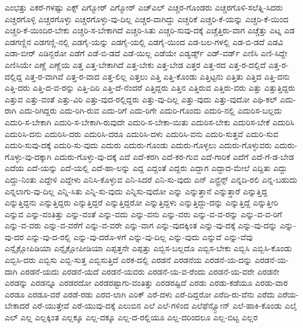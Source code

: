 {ಎಂಭತ್ತು
ಎಕರೆ-ಗಳಷ್ಟು
ಎಕ್ಸ್
ಎಗ್ಮೋರ್
ಎಗ್ಮೋರ್
ಎಚ್ಎಲ್
ಎಚ್ಚರ-ಗೊಂಡರು
ಎಚ್ಚರಗೊಳಿ-ಸಲೆತ್ನಿ-ಸಿದರು
ಎಚ್ಚರಗೊಳ್ಳಿ
ಎಚ್ಚರಗೊಳ್ಳು
ಎಚ್ಚರಗೊಳ್ಳು-ವು-ದಿಲ್ಲ
ಎಚ್ಚರ-ವಾಗಿದ್ದು
ಎಚ್ಚರಿಕೆ
ಎಚ್ಚರಿ-ಕೆ-ಯನ್ನು
ಎಚ್ಚರಿ-ಕೆ-ಯಿಂದ
ಎಚ್ಚರಿ-ಕೆ-ಯಿಂದಿರ-ಬೇಕು
ಎಚ್ಚರಿ-ಸ-ಬೇಕಾಗಿದೆ
ಎಚ್ಚರಿ-ಸಿತು
ಎಚ್ಚರಿ-ಸುವು-ದಕ್ಕೆ
ಎಚ್ಚೆತ್ತಿರು-ವಾಗ
ಎಚ್ಚೆತ್ತು
ಎಟ್ನ
ಎಡ
ಎಡಗಣ್ಣಿನ
ಎಡಗಣ್ಣಿ-ನಲ್ಲಿ
ಎಡಗೈ-ಯನ್ನು
ಎಡಗೈ-ಯಲ್ಲಿ
ಎಡಗೈ-ಯಿಂದ
ಎಡ-ಬಲ-ಗಳಲ್ಲಿ
ಎಡ-ಬಿ-ಡದೆ
ಎಡವಿ
ಎಡಾ-ಬೀರ್
ಎಡಿನ್ಬರೋ
ಎಡೆಗೆ
ಎಡೆ-ಬಿ-ಡದೆ
ಎಡೆ-ಯಿಲ್ಲ
ಎಡೆಯೇ
ಎಡ್ವರ್ಡ್ಸ್
ಎಡ್-ವರ್ಡ್
ಎಣಿಸಿ
ಎಣಿ-ಸಿದ್ದೇ
ಎಣಿಸಿಯೇ
ಎಣ್ಣೆ
ಎಣ್ಣೆಯ
ಎತ್ತ
ಎತ್ತ-ಬೇಕಾಗಿದೆ
ಎತ್ತ-ಬೇಕು
ಎತ್ತ-ಬೇಡ
ಎತ್ತರ
ಎತ್ತ-ರದ
ಎತ್ತ-ರ-ದಲ್ಲಿದೆ
ಎತ್ತ-ರ-ದಲ್ಲಿದ್ದ
ಎತ್ತ-ರ-ವಾಗಿವೆ
ಎತ್ತ-ರ-ವಾದ
ಎತ್ತ-ಲಿಲ್ಲ
ಎತ್ತಲು
ಎತ್ತಿ
ಎತ್ತಿ-ಕೊಂಡು
ಎತ್ತಿಟ್ಟನು
ಎತ್ತಿತು
ಎತ್ತಿದ
ಎತ್ತಿ-ದನು
ಎತ್ತಿ-ದರು
ಎತ್ತಿ-ದ-ವ-ರನ್ನು
ಎತ್ತಿ-ದಿರಿ
ಎತ್ತಿ-ದೆ-ನೆಂದರೆ
ಎತ್ತಿದ್ದರು
ಎತ್ತಿನ
ಎತ್ತಿರುವ
ಎತ್ತಿರು-ವರು
ಎತ್ತು
ಎತ್ತುತ್ತಿದ್ದರು
ಎತ್ತುವ
ಎತ್ತು-ವಂತೆ
ಎತ್ತು-ವಿರಿ
ಎತ್ತು-ವುದ-ರಲ್ಲಿದ್ದರು
ಎತ್ತು-ವು-ದಿಲ್ಲ
ಎತ್ತು-ವುದು
ಎತ್ತು-ವುದೋ
ಎಥಿ-ಕಲ್
ಎದು-ರಾಗಿ
ಎದು-ರಿಗಿದ್ದರು
ಎದು-ರಿಗಿ-ರುವ
ಎದು-ರಿಗೆ
ಎದು-ರಿಗೇ
ಎದುರಿ-ಗೊಂದು
ಎದುರಿ-ನಲ್ಲಿ
ಎದುರಿಸ-ಬಲ್ಲದು
ಎದುರಿ-ಸ-ಬೇಕಾಗಿ
ಎದುರಿ-ಸ-ಬೇಕಾಗಿ-ರುವುದೇ
ಎದುರಿ-ಸ-ಬೇಕಾ-ಯಿತು
ಎದುರಿಸ-ಬೇಕು
ಎದುರಿಸ-ಬೇಕೆ
ಎದುರಿಸಿ
ಎದುರಿಸಿ-ದನು
ಎದುರಿಸಿ-ದರು
ಎದುರಿಸಿ-ದರೂ
ಎದುರಿಸಿ-ದಳು
ಎದುರಿಸಿ-ವನು
ಎದುರಿ-ಸುತ್ತವೆ
ಎದುರಿ-ಸುವ
ಎದುರಿ-ಸುವು-ದಕ್ಕೆ
ಎದುರಿ-ಸು-ವುದು
ಎದುರು
ಎದುರು-ಗೊಂಡು
ಎದುರು-ಗೊಳ್ಳಲು
ಎದುರು-ಗೊಳ್ಳುವರು
ಎದುರು-ಗೊಳ್ಳು-ವು-ದಕ್ಕಾಗಿ
ಎದುರು-ಗೊಳ್ಳು-ವು-ದಕ್ಕೆ
ಎದೆ
ಎದೆ-ಕರಗಿ
ಎದೆ-ಕರ-ಗುವ
ಎದೆ-ಗಾರಿಕೆ
ಎದೆಗೆ
ಎದೆ-ಗೆ-ಡ-ಬೇಡ
ಎದೆಯ
ಎದೆ-ಯನ್ನು
ಎದೆ-ಯಲ್ಲಿ
ಎದೆ-ಹಾ-ಲನ್ನು
ಎದ್ದ
ಎದ್ದಂತೆ
ಎದ್ದರು
ಎದ್ದಾಗ
ಎದ್ದಾದ-ಮೇಲೆ
ಎದ್ದಿತು
ಎದ್ದು
ಎದ್ದು-ನಿಂತು
ಎದ್ದೇಳಿ
ಎದ್ದೇಳು
ಎನಿಸಿ-ಕೊಳ್ಳುವ
ಎನಿ-ಸಿದರೆ
ಎನಿ-ಸು-ವುದು
ಎನ್
ಎನ್ಟ್ರೆನ್ಸ್
ಎನ್ನದಿ-ರಲಿ
ಎನ್ನ-ಬಹುದು
ಎನ್ನಲಾಗು-ವು-ದಿಲ್ಲ
ಎನ್ನಿ-ಸಿತು
ಎನ್ನಿ-ಸು-ವುದು
ಎನ್ನಿಸು-ವುದೋ
ಎನ್ನು
ಎನ್ನುತ್ತಾನೆ
ಎನ್ನುತ್ತಾರೆ
ಎನ್ನುತ್ತಿದ್ದ
ಎನ್ನುತ್ತಿದ್ದನು
ಎನ್ನುತ್ತಿದ್ದರು
ಎನ್ನುತ್ತಿದ್ದರೆ
ಎನ್ನುತ್ತಿದ್ದರೋ
ಎನ್ನುತ್ತಿದ್ದಳು
ಎನ್ನುತ್ತಿದ್ದು-ದನ್ನು
ಎನ್ನುತ್ತಿದ್ದೆ
ಎನ್ನುತ್ತೀರಿ
ಎನ್ನುವ
ಎನ್ನು-ವಂತಿತ್ತು
ಎನ್ನು-ವಂತೆ
ಎನ್ನು-ವದು
ಎನ್ನು-ವನು
ಎನ್ನು-ವರು
ಎನ್ನು-ವ-ವ-ರನ್ನು
ಎನ್ನು-ವ-ವ-ರಿಗೆ
ಎನ್ನು-ವ-ವರು
ಎನ್ನು-ವ-ವರೆಗೆ
ಎನ್ನು-ವ-ವರೇ
ಎನ್ನು-ವಾಗ
ಎನ್ನು-ವುದಕ್ಕಿಂತ
ಎನ್ನು-ವು-ದಕ್ಕೆ
ಎನ್ನು-ವು-ದನ್ನು
ಎನ್ನು-ವು-ದರ
ಎನ್ನು-ವು-ದ-ರಲ್ಲಿ
ಎನ್ನು-ವು-ದರೊ-ಳಗೆ
ಎನ್ನು-ವು-ದಿಲ್ಲ
ಎನ್ನು-ವುದು
ಎನ್ನುವೆ
ಎನ್ನು-ವೆವು
ಎನ್ಸೈಕ್ಲೋಪಿಡಿಯಾ
ಎನ್ಸೈಕ್ಲೋಪೀಡಿಯಾ
ಎಪ್ಪತ್ತನೇ
ಎಪ್ಪತ್ತು
ಎಬ್ಬಿಸ-ಬಲ್ಲದೊ
ಎಬ್ಬಿಸ-ಬೇಕು
ಎಬ್ಬಿಸಿ
ಎಬ್ಬಿಸಿ-ಕೊಂಡು
ಎಬ್ಬಿಸಿ-ದರು
ಎಬ್ಬಿಸು
ಎಬ್ಬಿ-ಸುತ್ತ
ಎಬ್ಬಿಸುತ್ತಿದೆ
ಎರಕ-ದಲ್ಲಿ
ಎರಡನೆ
ಎರಡನೆಯ
ಎರಡನೆ-ಯ-ದನ್ನು
ಎರಡನೆ-ಯ-ದಾಗಿ
ಎರಡನೆ-ಯದು
ಎರಡನೆ-ಯದೆ
ಎರಡನೆ-ಯವರು
ಎರಡನೆ-ಯ-ವ-ರೆಂದು
ಎರಡನೆ-ಯ-ವರೇ
ಎರಡನೇ
ಎರಡನ್ನು
ಎರಡನ್ನೂ
ಎರಡರದೋ
ಎರಡರಷ್ಟಾಗು-ವಂತಿತ್ತು
ಎರಡರಷ್ಟಿದೆ
ಎರಡು
ಎರಡು-ಕಡೆಯೂ
ಎರಡು-ವಾರ
ಎರಡೂ
ಎರಡೂ-ವರೆ
ಎರಡೆ-ರಡು
ಎರವ-ಲಾಗಿ
ಎರಿಕ್
ಎರೆ-ದಳು
ಎರೆ-ದಿದ್ದರೋ
ಎರೆದಿ-ರು-ವೆನು
ಎರೆದು
ಎರೆಯ-ಬೇಕಾದರೆ
ಎರೆ-ಯುತ್ತೇವೆ
ಎರೆ-ಯುವು-ದಕ್ಕೆ
ಎಲುಬಿನ
ಎಲೆ
ಎಲೆ-ಗಳಿಂದ
ಎಲೆಫೆನ್ಸ್ಟೋನ್
ಎಲೆ-ಹಾಕಿ-ಕೊಂಡು
ಎಲೈ
ಎಲ್
ಎಲ್ಲ
ಎಲ್ಲಕ್ಕಿಂತ
ಎಲ್ಲಕ್ಕೂ
ಎಲ್ಲ-ದಕ್ಕೂ
ಎಲ್ಲ-ದ-ರಲ್ಲಿಯೂ
ಎಲ್ಲ-ದರಿಂದಲೂ
ಎಲ್ಲ-ಬಿಟ್ಟ
ಎಲ್ಲರ
}
